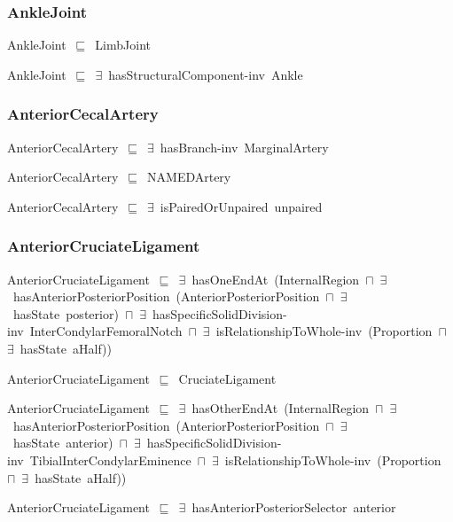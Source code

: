 \documentclass{article}
\begin{document}
\subsubsection*{AnkleJoint}

AnkleJoint~\ensuremath{\sqsubseteq}~LimbJoint~

AnkleJoint~\ensuremath{\sqsubseteq}~\ensuremath{\exists}~hasStructuralComponent-inv~Ankle~

\subsubsection*{AnteriorCecalArtery}

AnteriorCecalArtery~\ensuremath{\sqsubseteq}~\ensuremath{\exists}~hasBranch-inv~MarginalArtery~

AnteriorCecalArtery~\ensuremath{\sqsubseteq}~NAMEDArtery~

AnteriorCecalArtery~\ensuremath{\sqsubseteq}~\ensuremath{\exists}~isPairedOrUnpaired~unpaired~

\subsubsection*{AnteriorCruciateLigament}

AnteriorCruciateLigament~\ensuremath{\sqsubseteq}~\ensuremath{\exists}~hasOneEndAt~(InternalRegion~\ensuremath{\sqcap}~\ensuremath{\exists}~hasAnteriorPosteriorPosition~(AnteriorPosteriorPosition~\ensuremath{\sqcap}~\ensuremath{\exists}~hasState~posterior)~\ensuremath{\sqcap}~\ensuremath{\exists}~hasSpecificSolidDivision-inv~InterCondylarFemoralNotch~\ensuremath{\sqcap}~\ensuremath{\exists}~isRelationshipToWhole-inv~(Proportion~\ensuremath{\sqcap}~\ensuremath{\exists}~hasState~aHalf))~

AnteriorCruciateLigament~\ensuremath{\sqsubseteq}~CruciateLigament~

AnteriorCruciateLigament~\ensuremath{\sqsubseteq}~\ensuremath{\exists}~hasOtherEndAt~(InternalRegion~\ensuremath{\sqcap}~\ensuremath{\exists}~hasAnteriorPosteriorPosition~(AnteriorPosteriorPosition~\ensuremath{\sqcap}~\ensuremath{\exists}~hasState~anterior)~\ensuremath{\sqcap}~\ensuremath{\exists}~hasSpecificSolidDivision-inv~TibialInterCondylarEminence~\ensuremath{\sqcap}~\ensuremath{\exists}~isRelationshipToWhole-inv~(Proportion~\ensuremath{\sqcap}~\ensuremath{\exists}~hasState~aHalf))~

AnteriorCruciateLigament~\ensuremath{\sqsubseteq}~\ensuremath{\exists}~hasAnteriorPosteriorSelector~anterior~
\end{document}
